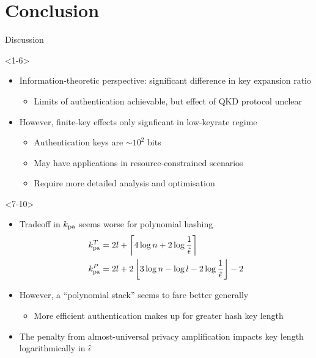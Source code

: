 \documentclass[xcolor=dvipsnames]{beamer}
\newcommand{\?}{\mathrel{?}} %
\newcommand{\ceil}[1]{\left\lceil#1\right\rceil} %
\newcommand{\floor}[1]{\left\lfloor#1\right\rfloor} %
\newcommand{\pa}{\rm pa}
\begin{document}
\section*{Conclusion}

\begin{frame}{Discussion}
  \begin{onlyenv}<1-6>
    \begin{itemize}[<+->]
      \item Information-theoretic perspective: significant difference in key expansion ratio
        \begin{itemize}
          \item Limits of authentication achievable, but effect of QKD protocol unclear
        \end{itemize}
      \item However, finite-key effects only signficant in low-keyrate regime
        \begin{itemize}
          \item Authentication keys are \(\sim 10^2\) bits
          \item May have applications in resource-constrained scenarios
          \item Require more detailed analysis and optimisation
        \end{itemize}
    \end{itemize}
  \end{onlyenv}
  \begin{onlyenv}<7-10>
    \begin{itemize}[<+->]
      \item Tradeoff in \(k_{\pa}\) seems worse for polynomial hashing
        \begin{align*}
          k_{\pa}^T &= 2l + \ceil{ 4\log n + 2\log \frac{1}{\hat{\epsilon}} } \\
          k_{\pa}^P &= 2l + 2\floor{ 3 \log n - \log l - 2\log \frac{1}{\hat{\epsilon}} } - 2
        \end{align*}
      \item However, a ``polynomial stack'' seems to fare better generally
        \begin{itemize}
          \item More efficient authentication makes up for greater hash key length
        \end{itemize}
      \item The penalty from almost-universal privacy amplification impacts key length logarithmically in \(\hat{\epsilon}\)
    \end{itemize}

\end{onlyenv}
\end{frame}
\end{document}
